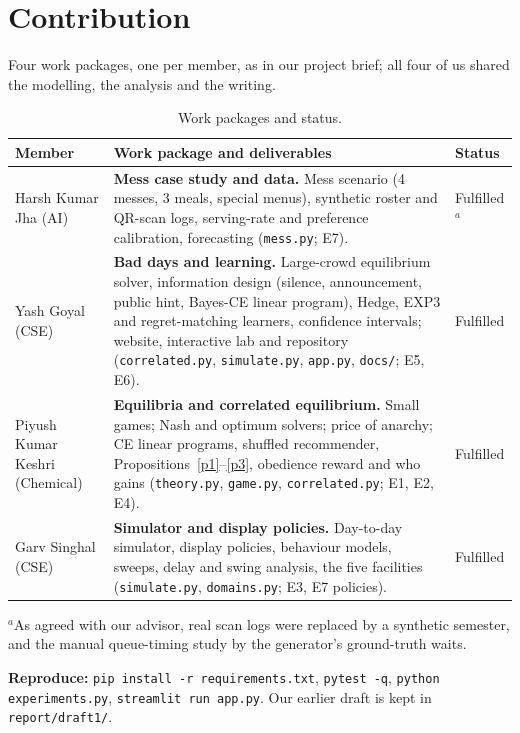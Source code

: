 \documentclass{article}
\begin{document}
\section{Contribution}
Four work packages, one per member, as in our project brief; all four of us shared the modelling, the analysis and
the writing.
\begin{table}[H]\centering\small
\caption{Work packages and status.}\label{tab:contrib}
\begin{tabular}{@{}>{\raggedright\arraybackslash}p{2.7cm}>{\raggedright\arraybackslash}p{11.5cm}>{\raggedright\arraybackslash}p{1.4cm}@{}}\toprule
Member & Work package and deliverables & Status\\\midrule
Harsh Kumar Jha (AI) & \textbf{Mess case study and data.} Mess scenario (4 messes, 3 meals, special menus), synthetic
roster and QR-scan logs, serving-rate and preference calibration, forecasting (\texttt{mess.py}; E7). &
Fulfilled$^{a}$\\
Yash Goyal (CSE) & \textbf{Bad days and learning.} Large-crowd equilibrium solver, information design (silence,
announcement, public hint, Bayes-CE linear program), Hedge, EXP3 and regret-matching learners, confidence intervals;
website, interactive lab and repository (\texttt{correlated.py}, \texttt{simulate.py}, \texttt{app.py},
\texttt{docs/}; E5, E6). & Fulfilled\\
Piyush Kumar Keshri (Chemical) & \textbf{Equilibria and correlated equilibrium.} Small games; Nash and optimum solvers;
price of anarchy; CE linear programs, shuffled recommender, Propositions~\ref{p1}--\ref{p3}, obedience reward and who
gains (\texttt{theory.py}, \texttt{game.py}, \texttt{correlated.py}; E1, E2, E4). & Fulfilled\\
Garv Singhal (CSE) & \textbf{Simulator and display policies.} Day-to-day simulator, display policies, behaviour
models, sweeps, delay and swing analysis, the five facilities (\texttt{simulate.py}, \texttt{domains.py}; E3, E7
policies). & Fulfilled\\\bottomrule
\end{tabular}

\vspace{2pt}\raggedright\footnotesize $^{a}$As agreed with our advisor, real scan logs were replaced by a synthetic
semester, and the manual queue-timing study by the generator's ground-truth waits.
\end{table}
{\raggedright\noindent\textbf{Reproduce:} \texttt{pip install -r requirements.txt}, \texttt{pytest -q},
\texttt{python experiments.py}, \texttt{streamlit run app.py}. Our earlier draft is kept in
\texttt{report/draft1/}.\par}
\end{document}
